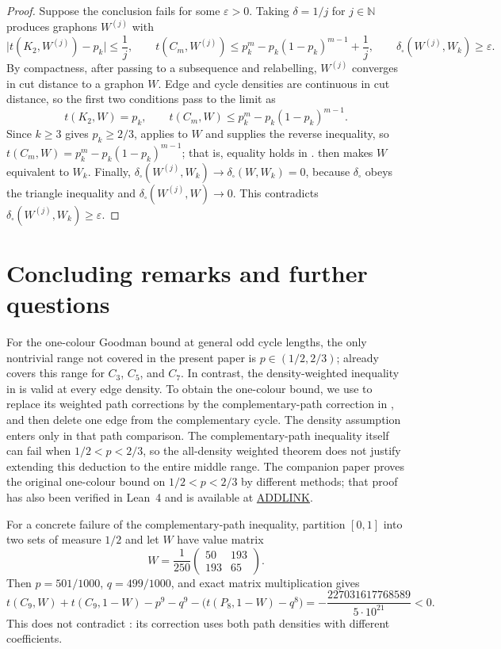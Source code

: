 \documentclass[11pt]{article}
\numberwithin{equation}{section}
\newcommand{\tC}[2]{t(C_{#1},#2)}
\newcommand{\tP}[2]{t(P_{#1},#2)}
\newcommand{\edens}[1]{t(K_{2},#1)}
\begin{document}
\begin{proof}
  Suppose the conclusion fails for some $\varepsilon>0$.
  Taking $\delta=1/j$ for $j\in\mathbb N$ produces graphons $W^{(j)}$ with
  \[
    \bigl|\edens{W^{(j)}}-p_k\bigr|\le\frac1j,
    \qquad
    \tC m{W^{(j)}}\le p_k^m-p_k(1-p_k)^{m-1}+\frac1j,
    \qquad
    \delta_\square(W^{(j)},W_k)\ge\varepsilon .
  \]
  By compactness, after passing to a subsequence and relabelling, $W^{(j)}$ converges in cut distance to a graphon $W$.
  Edge and cycle densities are continuous in cut distance, so the first two conditions pass to the limit as
  \[
    \edens W=p_k,
    \qquad
    \tC mW\le p_k^m-p_k(1-p_k)^{m-1}.
  \]
  Since $k\ge3$ gives $p_k\ge2/3$,  applies to $W$ and supplies the reverse inequality, so $\tC mW=p_k^m-p_k(1-p_k)^{m-1}$; that is, equality holds in .
   then makes $W$ equivalent to $W_k$.
  Finally, $\delta_\square(W^{(j)},W_k)\to\delta_\square(W,W_k)=0$, because $\delta_\square$ obeys the triangle inequality and $\delta_\square(W^{(j)},W)\to0$.
  This contradicts $\delta_\square(W^{(j)},W_k)\ge\varepsilon$.
\end{proof}

\section{Concluding remarks and further questions}
\label{sec:conclusion}

For the one-colour Goodman bound at general odd cycle lengths, the
only nontrivial range not covered in the present paper is
$p\in(1/2,2/3)$;  already covers this range
for $C_3$, $C_5$, and $C_7$. In contrast, the density-weighted
inequality in  is valid at every edge
density. To obtain the one-colour bound, we use
 to replace its weighted path
corrections by the complementary-path correction in
, and then delete one edge from the
complementary cycle. The density assumption enters only in that
path comparison. The complementary-path inequality itself can fail
when $1/2<p<2/3$, so the all-density weighted theorem does not
justify extending this deduction to the entire middle range.
The companion paper proves the original one-colour bound on $1/2<p<2/3$ by different methods; that proof has also been verified in Lean~4 and is available at \url{ADDLINK}.

For a concrete failure of the complementary-path inequality, partition
$[0,1]$ into two sets of measure $1/2$ and let $W$ have value matrix
\[
  W=\frac1{250}\begin{pmatrix}50&193\\193&65\end{pmatrix}.
\]
Then $p=501/1000$, $q=499/1000$, and exact matrix multiplication gives
\begin{equation}\label{eq:nine-cycle-counterexample}
  \tC9W+\tC9{1-W}-p^9-q^9
     -\bigl(\tP8{1-W}-q^8\bigr)
       =-\frac{227031617768589}{5\cdot10^{21}}<0.
\end{equation}
This does not contradict : its
correction uses both path densities with different coefficients.
\end{document}
